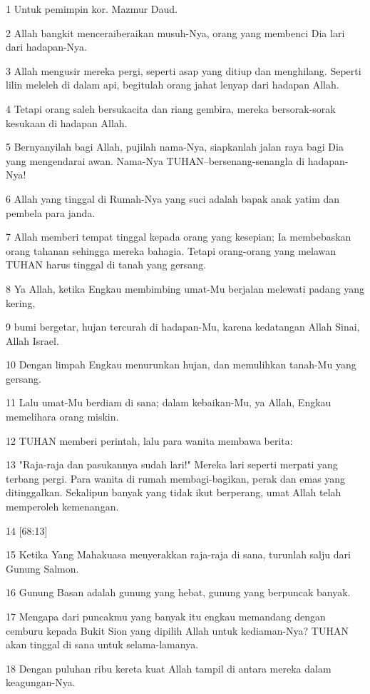 \par 1 Untuk pemimpin kor. Mazmur Daud.
\par 2 Allah bangkit menceraiberaikan musuh-Nya, orang yang membenci Dia lari dari hadapan-Nya.
\par 3 Allah mengusir mereka pergi, seperti asap yang ditiup dan menghilang. Seperti lilin meleleh di dalam api, begitulah orang jahat lenyap dari hadapan Allah.
\par 4 Tetapi orang saleh bersukacita dan riang gembira, mereka bersorak-sorak kesukaan di hadapan Allah.
\par 5 Bernyanyilah bagi Allah, pujilah nama-Nya, siapkanlah jalan raya bagi Dia yang mengendarai awan. Nama-Nya TUHAN--bersenang-senangla di hadapan-Nya!
\par 6 Allah yang tinggal di Rumah-Nya yang suci adalah bapak anak yatim dan pembela para janda.
\par 7 Allah memberi tempat tinggal kepada orang yang kesepian; Ia membebaskan orang tahanan sehingga mereka bahagia. Tetapi orang-orang yang melawan TUHAN harus tinggal di tanah yang gersang.
\par 8 Ya Allah, ketika Engkau membimbing umat-Mu berjalan melewati padang yang kering,
\par 9 bumi bergetar, hujan tercurah di hadapan-Mu, karena kedatangan Allah Sinai, Allah Israel.
\par 10 Dengan limpah Engkau menurunkan hujan, dan memulihkan tanah-Mu yang gersang.
\par 11 Lalu umat-Mu berdiam di sana; dalam kebaikan-Mu, ya Allah, Engkau memelihara orang miskin.
\par 12 TUHAN memberi perintah, lalu para wanita membawa berita:
\par 13 "Raja-raja dan pasukannya sudah lari!" Mereka lari seperti merpati yang terbang pergi. Para wanita di rumah membagi-bagikan, perak dan emas yang ditinggalkan. Sekalipun banyak yang tidak ikut berperang, umat Allah telah memperoleh kemenangan.
\par 14 [68:13]
\par 15 Ketika Yang Mahakuasa menyerakkan raja-raja di sana, turunlah salju dari Gunung Salmon.
\par 16 Gunung Basan adalah gunung yang hebat, gunung yang berpuncak banyak.
\par 17 Mengapa dari puncakmu yang banyak itu engkau memandang dengan cemburu kepada Bukit Sion yang dipilih Allah untuk kediaman-Nya? TUHAN akan tinggal di sana untuk selama-lamanya.
\par 18 Dengan puluhan ribu kereta kuat Allah tampil di antara mereka dalam keagungan-Nya.
